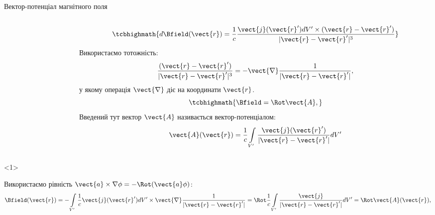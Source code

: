\documentclass{beamer}
\begin{document}
\begin{frame}[t]{Вектор-потенціал магнітного поля}{}
\begin{columns}
\begin{column}{0.35\linewidth}
		\end{column}
		\begin{column}{0.65\linewidth}
			\begin{block}{}
				\begin{overprint}
				\begin{equation*}
					\tcbhighmath{d\Bfield(\vect{r}) = \frac1c \frac{ \vect{j}(\vect{r}')dV'\times(\vect{r} - \vect{r}') }{|\vect{r} - \vect{r}'|^3}}
				\end{equation*}
					Використаємо тотожність:
					\begin{equation*}
						\frac{ (\vect{r} - \vect{r}') }{|\vect{r} - \vect{r}'|^3} = - \vect{\nabla} \frac{ 1 }{|\vect{r} - \vect{r}'|},
					\end{equation*}
					у якому операція $\vect{\nabla}$ діє на координати $\vect{r}$.
					\onslide<2>
					\begin{equation*}
						\tcbhighmath{\Bfield = \Rot\vect{A},}
					\end{equation*}
					Введений тут вектор $\vect{A}$ називається \alert{вектор-потенціалом}:
					\begin{equation*}
						\vect{A}(\vect{r}) = \frac1c \int\limits_{V'} \frac{\vect{j}(\vect{r}')}{|\vect{r} - \vect{r}'|} dV'
					\end{equation*}
				\end{overprint}
			\end{block}
		\end{column}
	\end{columns}
	\begin{onlyenv}
		\begin{block}{}\justifying
			Використаємо рівність $\vect{a}\times\nabla{\phi} = - \Rot(\vect{a}\phi)$:
			\begin{equation*}
				\Bfield(\vect{r}) = - \int\limits_{V'} \frac1c \vect{j} (\vect{r}') dV' \times \vect{\nabla} \frac{ 1 }{|\vect{r} - \vect{r}'|} =
				\Rot \frac1c \int\limits_{V'} \frac{\vect{j}}{|\vect{r} - \vect{r}'|} dV' = \Rot\vect{A}(\vect{r}),
			\end{equation*}
		\end{block}
	\end{onlyenv}
\end{frame}
\end{document}
